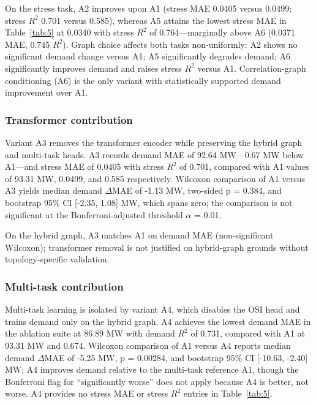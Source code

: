On the stress task, A2 improves upon A1 (stress MAE 0.0405 versus 0.0499; stress $R^2$ 0.701 versus 0.585), whereas A5 attains the lowest stress MAE in Table~\ref{tab:5} at 0.0340 with stress $R^2$ of 0.764---marginally above A6 (0.0371 MAE, 0.745 $R^2$). Graph choice affects both tasks non-uniformly: A2 shows no significant demand change versus A1; A5 significantly degrades demand; A6 significantly improves demand and raises stress $R^2$ versus A1. Correlation-graph conditioning (A6) is the only variant with statistically supported demand improvement over A1.

\subsubsection{Transformer contribution}\label{subsubsection:transformer_contribution}

Variant A3 removes the transformer encoder while preserving the hybrid graph and multi-task heads. A3 records demand MAE of 92.64 MW---0.67 MW below A1---and stress MAE of 0.0405 with stress $R^2$ of 0.701, compared with A1 values of 93.31 MW, 0.0499, and 0.585 respectively. Wilcoxon comparison of A1 versus A3 yields median demand $\Delta$MAE of -1.13 MW, two-sided p = 0.384, and bootstrap 95\% CI [-2.35, 1.08] MW, which spans zero; the comparison is not significant at the Bonferroni-adjusted threshold $\alpha$ = 0.01.

On the hybrid graph, A3 matches A1 on demand MAE (non-significant Wilcoxon); transformer removal is not justified on hybrid-graph grounds without topology-specific validation.

\subsubsection{Multi-task contribution}\label{subsubsection:multi_task_contribution}

Multi-task learning is isolated by variant A4, which disables the OSI head and trains demand only on the hybrid graph. A4 achieves the lowest demand MAE in the ablation suite at 86.89 MW with demand $R^2$ of 0.731, compared with A1 at 93.31 MW and 0.674. Wilcoxon comparison of A1 versus A4 reports median demand $\Delta$MAE of -5.25 MW, p = 0.00284, and bootstrap 95\% CI [-10.63, -2.40] MW; A4 improves demand relative to the multi-task reference A1, though the Bonferroni flag for “significantly worse” does not apply because A4 is better, not worse. A4 provides no stress MAE or stress $R^2$ entries in Table~\ref{tab:5}.

